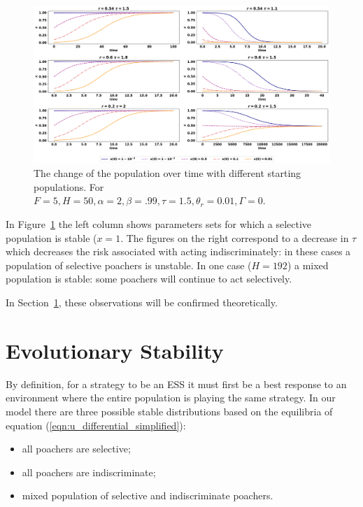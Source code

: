 \documentclass[10pt]{article}
\begin{document}
\begin{figure}[!htbp]
    \includegraphics[width=\textwidth]{images/evolution_of_system.pdf}
    \caption{\label{fig:evolution_of_system} The change of the population over
    time with different starting populations. For \(F=5, H=50,
    \alpha=2, \beta=.99, \tau=1.5, \theta_r=0.01, \Gamma=0\).}
\end{figure}

In Figure~\ref{fig:evolution_of_system} the left column shows parameters sets
for which a selective population is stable (\(x=1\). The figures on the right
correspond to a decrease in \(\tau\) which decreases the risk associated with
acting indiscriminately: in these cases a population of selective poachers is
unstable. In one case (\(H=192\)) a mixed population is stable: some poachers
will continue to act selectively.

In Section~\ref{section:evolutionary_stability}, these observations will be
confirmed theoretically.

\section{Evolutionary Stability}\label{section:evolutionary_stability}

By definition, for a strategy to be an ESS it must first be a best response to an
environment where the entire population is playing the same strategy.
In our model there are three possible stable distributions based on the
equilibria of equation (\ref{eqn:u_differential_simplified}):

\begin{itemize}
    \item all poachers are selective;
    \item all poachers are indiscriminate;
    \item mixed population of selective and indiscriminate poachers.
\end{itemize}
\end{document}

